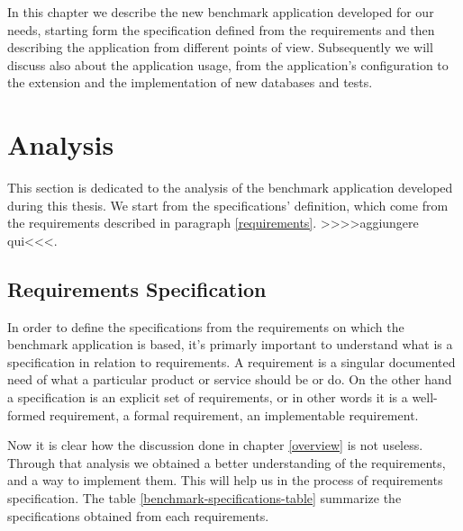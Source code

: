 In this chapter we describe the new benchmark application developed for our needs, starting form the specification defined from the requirements and then describing the application from different points of view. Subsequently we will discuss also about the application usage, from the application's configuration to the extension and the implementation of new databases and tests.

		\section{Analysis}
	This section is dedicated to the analysis of the benchmark application developed during this thesis. We start from the specifications' definition, which come from the requirements described in paragraph \ref{requirements}. >>>>aggiungere qui<<<.
	
	
		\subsection{Requirements Specification} %
In order to define the specifications from the requirements on which the benchmark application is based, it's primarly important to understand what is a specification in relation to requirements. A requirement is a singular documented need of what a particular product or service should be or do. On the other hand a specification is an explicit set of requirements, or in other words it is a well-formed requirement, a formal requirement, an implementable requirement. 

Now it is clear how the discussion done in chapter \ref{overview} is not useless. Through that analysis we obtained a better understanding of the requirements, and a way to implement them. This will help us in the process of requirements specification. The table \ref{benchmark-specifications-table} summarize the specifications obtained from each requirements. 

